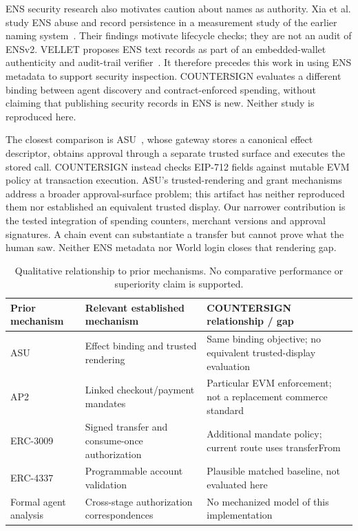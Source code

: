 \documentclass[11pt]{article}
\begin{document}
ENS security research also motivates caution about names as authority. Xia et al. study ENS abuse and record persistence in a measurement study of the earlier naming system~\cite{ensmeasurement}. Their findings motivate lifecycle checks; they are not an audit of ENSv2. VELLET proposes ENS text records as part of an embedded-wallet authenticity and audit-trail verifier~\cite{vellet}. It therefore precedes this work in using ENS metadata to support security inspection. COUNTERSIGN evaluates a different binding between agent discovery and contract-enforced spending, without claiming that publishing security records in ENS is new. Neither study is reproduced here.

The closest comparison is ASU~\cite{asu}, whose gateway stores a canonical effect descriptor, obtains approval through a separate trusted surface and executes the stored call. COUNTERSIGN instead checks EIP-712 fields against mutable EVM policy at transaction execution. ASU's trusted-rendering and grant mechanisms address a broader approval-surface problem; this artifact has neither reproduced them nor established an equivalent trusted display. Our narrower contribution is the tested integration of spending counters, merchant versions and approval signatures. A chain event can substantiate a transfer but cannot prove what the human saw. Neither ENS metadata nor World login closes that rendering gap.

\begin{table}[htbp]\centering\small
\begin{tabular}{p{.20\linewidth}p{.34\linewidth}p{.36\linewidth}}\toprule
Prior mechanism & Relevant established mechanism & COUNTERSIGN relationship / gap\\\midrule
ASU~\cite{asu} & Effect binding and trusted rendering & Same binding objective; no equivalent trusted-display evaluation\\
AP2~\cite{ap2} & Linked checkout/payment mandates & Particular EVM enforcement; not a replacement commerce standard\\
ERC-3009~\cite{erc3009} & Signed transfer and consume-once authorization & Additional mandate policy; current route uses transferFrom\\
ERC-4337~\cite{erc4337} & Programmable account validation & Plausible matched baseline, not evaluated here\\
Formal agent analysis~\cite{agentformal} & Cross-stage authorization correspondences & No mechanized model of this implementation\\\bottomrule
\end{tabular}
\caption{Qualitative relationship to prior mechanisms. No comparative performance or superiority claim is supported.}\label{tab:related}
\end{table}
\end{document}
